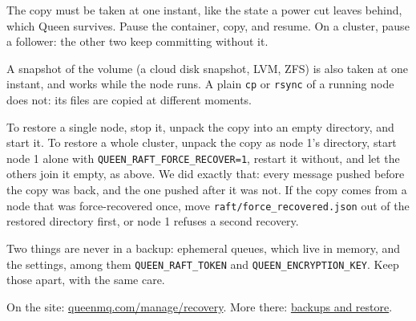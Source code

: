 The copy must be taken at one instant, like the state a power cut leaves behind, which Queen
survives. Pause the container, copy, and resume. On a cluster, pause a follower: the other two
keep committing without it.


A snapshot of the volume (a cloud disk snapshot, LVM, ZFS) is also taken at one instant, and works
while the node runs. A plain \texttt{cp} or \texttt{rsync} of a running node does not: its files
are copied at different moments.

To restore a single node, stop it, unpack the copy into an empty directory, and start it. To
restore a whole cluster, unpack the copy as node 1's directory, start node 1 alone with
\texttt{QUEEN\_RAFT\_FORCE\_RECOVER=1}, restart it without, and let the others join it empty, as
above. We did exactly that: every message pushed before the copy was back, and the one pushed after
it was not. If the copy comes from a node that was force-recovered once, move
\texttt{raft/force\_recovered.json} out of the restored directory first, or node 1 refuses a second
recovery.



Two things are never in a backup: ephemeral queues, which live in memory, and the settings, among
them \texttt{QUEEN\_RAFT\_TOKEN} and \texttt{QUEEN\_ENCRYPTION\_KEY}. Keep those apart, with the
same care.

On the site: \href{https://queenmq.com/manage/recovery/}{queenmq.com/manage/recovery}. More there: \href{https://queenmq.com/manage/backups/}{backups and restore}.
